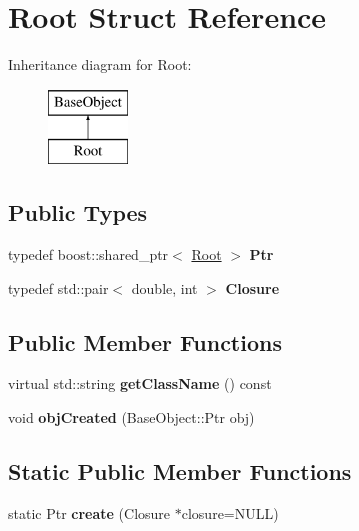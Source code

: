 \hypertarget{struct_root}{
\section{Root Struct Reference}
\label{struct_root}
}
Inheritance diagram for Root:\begin{figure}[H]
\begin{center}
\leavevmode
\includegraphics[height=2.000000cm]{struct_root}
\end{center}
\end{figure}
\subsection*{Public Types}
\begin{DoxyCompactItemize}
\item 
\hypertarget{struct_root_ac88e2fc9ec740e51c91f1b2991972cbd}{
typedef boost::shared\_\-ptr$<$ \hyperlink{struct_root}{Root} $>$ {\bfseries Ptr}}
\label{struct_root_ac88e2fc9ec740e51c91f1b2991972cbd}

\item 
\hypertarget{struct_root_a6daaf82ea38e20d267344439e3c26576}{
typedef std::pair$<$ double, int $>$ {\bfseries Closure}}
\label{struct_root_a6daaf82ea38e20d267344439e3c26576}

\end{DoxyCompactItemize}
\subsection*{Public Member Functions}
\begin{DoxyCompactItemize}
\item 
\hypertarget{struct_root_af6da62aa054c938eaac301d5847fb9b7}{
virtual std::string {\bfseries getClassName} () const }
\label{struct_root_af6da62aa054c938eaac301d5847fb9b7}

\item 
\hypertarget{struct_root_a7a7f2b28f7d0a47eaae75448a1b91789}{
void {\bfseries objCreated} (BaseObject::Ptr obj)}
\label{struct_root_a7a7f2b28f7d0a47eaae75448a1b91789}

\end{DoxyCompactItemize}
\subsection*{Static Public Member Functions}
\begin{DoxyCompactItemize}
\item 
\hypertarget{struct_root_a3085afc466bfba61d6cf7851e3197e24}{
static Ptr {\bfseries create} (Closure $\ast$closure=NULL)}
\label{struct_root_a3085afc466bfba61d6cf7851e3197e24}

\end{DoxyCompactItemize}
